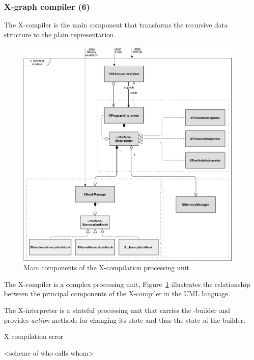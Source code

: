 \subsubsection{X-graph compiler (6)}
\label{ch:impl:proc:x-compiler}

The X-compiler is the main component that transforms the recursive \ytree{} data structure to the plain \xgraph{} representation.

\begin{figure}[!t]%
    \centering
  \includegraphics[max width=\textwidth,keepaspectratio]{img/my/draw.io/X-compiler.png}
  \caption{Main components of the X-compilation processing unit}
  \label{fig:compiler}
\end{figure}


The X-compiler is a complex processing unit, Figure~\ref{fig:compiler} illustrates the relationship between the principal components of the X-compiler in the UML language.

The X-interpreter is a stateful processing unit that carries the \xgraph{}-builder and provides \textit{action} methods for changing its state and thus the state of the builder.


X compilation error

<scheme of who calls whom>

